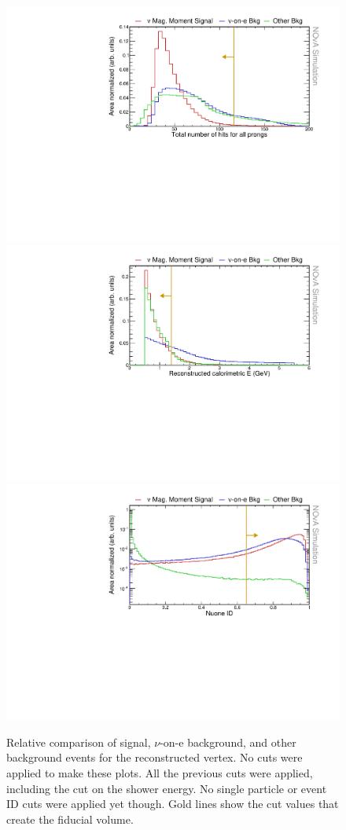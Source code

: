 \begin{figure}[hbtp]
\centering
\includegraphics[width=.9\textwidth]{Plots/NuMMEventSelection/N1Cut_NHitsPre.pdf}
\includegraphics[width=.9\textwidth]{Plots/NuMMEventSelection/N1Cut_calEHighPre.pdf}
\includegraphics[width=.9\textwidth]{Plots/NuMMEventSelection/LogY_N1Cut_nuoneidPre.pdf}
\caption{Relative comparison of signal, $\nu$-on-e background, and other background events for the reconstructed vertex. No cuts were applied to make these plots. All the previous cuts were applied, including the cut on the shower energy. No single particle or event ID cuts were applied yet though. Gold lines show the cut values that create the fiducial volume.}
\label{fig:SingleShowerCuts}
\end{figure}

